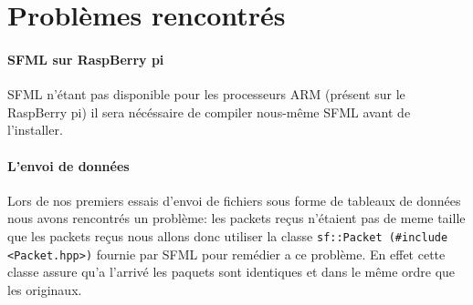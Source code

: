 \documentclass[12pt,a4paper,twoside]{article}
\begin{document}
    \section{Problèmes rencontrés}

    \paragraph*{SFML sur RaspBerry pi\\}
    SFML n'étant pas disponible pour les processeurs ARM (présent sur le RaspBerry pi) il sera nécéssaire de compiler nous-même SFML avant de l'installer.

    \paragraph*{L'envoi de données\\}
    Lors de nos premiers essais d'envoi de fichiers sous forme de tableaux de données nous avons rencontrés un problème: les packets reçus n'étaient pas de meme taille que les packets reçus nous allons donc utiliser la classe \lstinline$sf::Packet (#include <Packet.hpp>)$ fournie par SFML pour remédier a ce problème. En effet cette classe assure qu'a l'arrivé les paquets sont identiques et dans le même ordre que les originaux.

\end{document}
